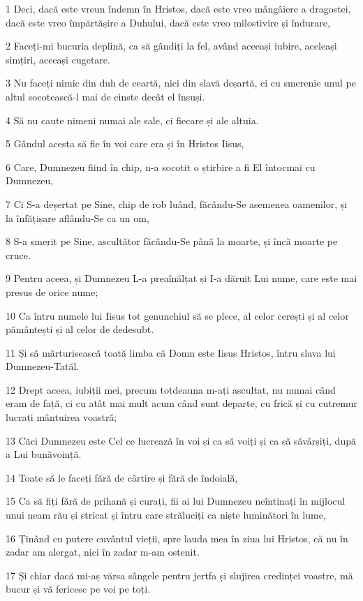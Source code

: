 \par 1 Deci, dacă este vreun îndemn în Hristos, dacă este vreo mângâiere a dragostei, dacă este vreo împărtășire a Duhului, dacă este vreo milostivire și îndurare,
\par 2 Faceți-mi bucuria deplină, ca să gândiți la fel, având aceeași iubire, aceleași simțiri, aceeași cugetare.
\par 3 Nu faceți nimic din duh de ceartă, nici din slavă deșartă, ci cu smerenie unul pe altul socotească-l mai de cinste decât el însuși.
\par 4 Să nu caute nimeni numai ale sale, ci fiecare și ale altuia.
\par 5 Gândul acesta să fie în voi care era și în Hristos Iisus,
\par 6 Care, Dumnezeu fiind în chip, n-a socotit o știrbire a fi El întocmai cu Dumnezeu,
\par 7 Ci S-a deșertat pe Sine, chip de rob luând, făcându-Se asemenea oamenilor, și la înfățișare aflându-Se ca un om,
\par 8 S-a smerit pe Sine, ascultător făcându-Se până la moarte, și încă moarte pe cruce.
\par 9 Pentru aceea, și Dumnezeu L-a preaînălțat și I-a dăruit Lui nume, care este mai presus de orice nume;
\par 10 Ca întru numele lui Iisus tot genunchiul să se plece, al celor cerești și al celor pământești și al celor de dedesubt.
\par 11 Și să mărturisească toată limba că Domn este Iisus Hristos, întru slava lui Dumnezeu-Tatăl.
\par 12 Drept aceea, iubiții mei, precum totdeauna m-ați ascultat, nu numai când eram de față, ci cu atât mai mult acum când sunt departe, cu frică și cu cutremur lucrați mântuirea voastră;
\par 13 Căci Dumnezeu este Cel ce lucrează în voi și ca să voiți și ca să săvârșiți, după a Lui bunăvoință.
\par 14 Toate să le faceți fără de cârtire și fără de îndoială,
\par 15 Ca să fiți fără de prihană și curați, fii ai lui Dumnezeu neîntinați în mijlocul unui neam rău și stricat și întru care străluciți ca niște luminători în lume,
\par 16 Ținând cu putere cuvântul vieții, spre lauda mea în ziua lui Hristos, că nu în zadar am alergat, nici în zadar m-am ostenit.
\par 17 Și chiar dacă mi-aș vărsa sângele pentru jertfa și slujirea credinței voastre, mă bucur și vă fericesc pe voi pe toți.
